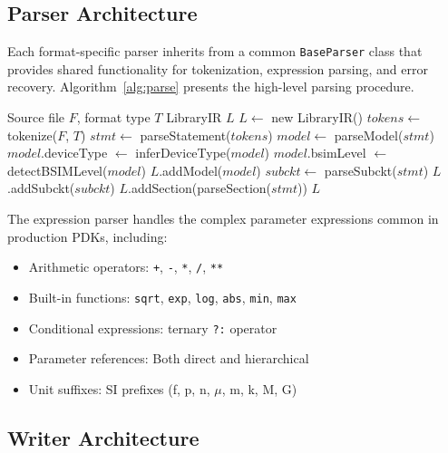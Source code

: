 \documentclass[conference]{IEEEtran}
\begin{document}
\subsection{Parser Architecture}

Each format-specific parser inherits from a common \texttt{BaseParser} class that provides shared functionality for tokenization, expression parsing, and error recovery. Algorithm~\ref{alg:parse} presents the high-level parsing procedure.

\begin{algorithm}[!t]
\caption{Model Library Parsing}
\label{alg:parse}
\begin{algorithmic}[1]
\REQUIRE Source file $F$, format type $T$
\ENSURE LibraryIR $L$
\STATE $L \gets$ new LibraryIR()
\STATE $tokens \gets$ tokenize($F$, $T$)
    \STATE $stmt \gets$ parseStatement($tokens$)
        \STATE $model \gets$ parseModel($stmt$)
        \STATE $model$.deviceType $\gets$ inferDeviceType($model$)
        \STATE $model$.bsimLevel $\gets$ detectBSIMLevel($model$)
        \STATE $L$.addModel($model$)
        \STATE $subckt \gets$ parseSubckt($stmt$)
        \STATE $L$.addSubckt($subckt$)
        \STATE $L$.addSection(parseSection($stmt$))
    \ENDIF
\ENDWHILE
\RETURN $L$
\end{algorithmic}
\end{algorithm}

The expression parser handles the complex parameter expressions common in production PDKs, including:

\begin{itemize}
    \item Arithmetic operators: \texttt{+}, \texttt{-}, \texttt{*}, \texttt{/}, \texttt{**}
    \item Built-in functions: \texttt{sqrt}, \texttt{exp}, \texttt{log}, \texttt{abs}, \texttt{min}, \texttt{max}
    \item Conditional expressions: ternary \texttt{?:} operator
    \item Parameter references: Both direct and hierarchical
    \item Unit suffixes: SI prefixes (f, p, n, $\mu$, m, k, M, G)
\end{itemize}

\subsection{Writer Architecture}
\end{document}
